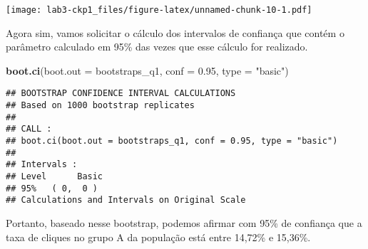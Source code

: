 \documentclass[]{article}
\newenvironment{Shaded}{\begin{snugshade}}{\end{snugshade}}
\newcommand{\KeywordTok}[1]{\textcolor[rgb]{0.13,0.29,0.53}{\textbf{#1}}}
\newcommand{\DataTypeTok}[1]{\textcolor[rgb]{0.13,0.29,0.53}{#1}}
\newcommand{\DecValTok}[1]{\textcolor[rgb]{0.00,0.00,0.81}{#1}}
\newcommand{\FloatTok}[1]{\textcolor[rgb]{0.00,0.00,0.81}{#1}}
\newcommand{\StringTok}[1]{\textcolor[rgb]{0.31,0.60,0.02}{#1}}
\newcommand{\OperatorTok}[1]{\textcolor[rgb]{0.81,0.36,0.00}{\textbf{#1}}}
\newcommand{\NormalTok}[1]{#1}
\begin{document}
\begin{Shaded}
\end{Shaded}

\texttt{[image: lab3-ckp1\_files/figure-latex/unnamed-chunk-10-1.pdf]}

Agora sim, vamos solicitar o cálculo dos intervalos de confiança que
contém o parâmetro calculado em 95\% das vezes que esse cálculo for
realizado.

\begin{Shaded}
\begin{Highlighting}[]
\KeywordTok{boot.ci}\NormalTok{(}\DataTypeTok{boot.out =}\NormalTok{ bootstraps_q1, }\DataTypeTok{conf =} \FloatTok{0.95}\NormalTok{, }\DataTypeTok{type =} \StringTok{"basic"}\NormalTok{)}
\end{Highlighting}
\end{Shaded}

\begin{verbatim}
## BOOTSTRAP CONFIDENCE INTERVAL CALCULATIONS
## Based on 1000 bootstrap replicates
## 
## CALL : 
## boot.ci(boot.out = bootstraps_q1, conf = 0.95, type = "basic")
## 
## Intervals : 
## Level      Basic         
## 95%   ( 0,  0 )  
## Calculations and Intervals on Original Scale
\end{verbatim}

Portanto, baseado nesse bootstrap, podemos afirmar com 95\% de confiança
que a taxa de cliques no grupo A da população está entre 14,72\% e
15,36\%.
\end{document}
